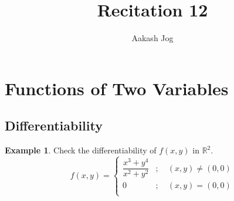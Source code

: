 \documentclass[fleqn, 12pt]{article}
\title{Recitation 12}
\author{Aakash Jog}
\date{\formatdate{14}{1}{2015}}
\theoremstyle{definition}
\newtheorem{example}{Example}
\theoremstyle{theorem}
\begin{document}
\maketitle

\tableofcontents

\newpage
\section{Functions of Two Variables}

\subsection{Differentiability}

\begin{example}
	Check the differentiability of $f(x,y)$ in $\mathbb{R}^2$.
	\begin{equation*}
		f(x,y) =
			\begin{cases}
				\dfrac{x^3 + y^4}{x^2 + y^2} &;\quad (x,y) \neq (0,0)\\
				0 &;\quad (x,y) = (0,0)\\
			\end{cases}
	\end{equation*}
\end{example}
\end{document}
